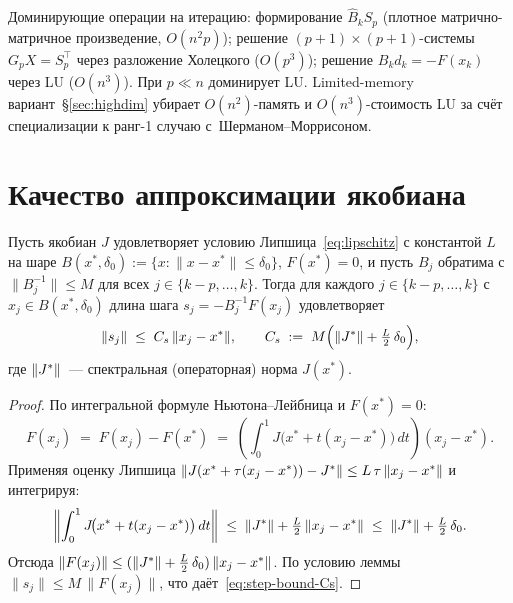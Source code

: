 \begin{remark}[Сложность]\label{rem:complexity}
Доминирующие операции на итерацию: формирование $\widehat B_k S_p$
(плотное матрично-матричное произведение, $O(n^2 p)$); решение
$(p{+}1)\times(p{+}1)$-системы $G_p X = S_p^\top$ через разложение
Холецкого ($O(p^3)$); решение $B_k d_k = -F(x_k)$ через LU
($O(n^3)$). При $p\ll n$ доминирует LU.
Limited-memory вариант~\S\ref{sec:highdim} убирает $O(n^2)$-память
и $O(n^3)$-стоимость LU за счёт специализации к ранг-1 случаю
с~Шерманом--Моррисоном.
\end{remark}

\section{Качество аппроксимации якобиана}\label{sec:sp-broyden-proof}



\begin{lemma}
\label{lem:step-bound}
Пусть якобиан $J$ удовлетворяет условию Липшица~\eqref{eq:lipschitz}
с константой $L$ на шаре $B(x^{*}, \delta_0) := \{x : \|x - x^{*}\| \le \delta_0\}$,
$F(x^{*}) = 0$, и пусть $B_j$ обратима с $\|B_j^{-1}\| \le M$
для всех $j \in \{k{-}p,\ldots,k\}$. Тогда для каждого
$j \in \{k{-}p,\ldots,k\}$ с $x_j \in B(x^{*}, \delta_0)$ длина шага
$s_j = -B_j^{-1} F(x_j)$ удовлетворяет
\begin{equation}\label{eq:step-bound-Cs}
  \|s_j\| \;\le\; C_s\,\|x_j - x^{*}\|,
  \qquad
  C_s \;:=\; M\Big(\|J^{*}\| + \tfrac{L}{2}\,\delta_0\Big),
\end{equation}
где $\|J^{*}\|$~--- спектральная (операторная) норма $J(x^{*})$.
\end{lemma}

\begin{proof}
По интегральной формуле Ньютона--Лейбница и $F(x^{*}) = 0$:
\[
  F(x_j) \;=\; F(x_j) - F(x^{*})
  \;=\; \left(\int_{0}^{1} J\!\big(x^{*} + t(x_j - x^{*})\big)\,dt\right)(x_j - x^{*}).
\]
Применяя оценку Липшица $\|J(x^{*} + \tau(x_j-x^{*})) - J^{*}\| \le L\,\tau\,\|x_j-x^{*}\|$
и интегрируя:
\[
  \left\|\int_{0}^{1} J\!\big(x^{*} + t(x_j-x^{*})\big)\,dt\right\|
  \;\le\; \|J^{*}\| + \tfrac{L}{2}\,\|x_j - x^{*}\|
  \;\le\; \|J^{*}\| + \tfrac{L}{2}\,\delta_0.
\]
Отсюда $\|F(x_j)\| \le (\|J^{*}\| + \tfrac{L}{2}\,\delta_0)\,\|x_j - x^{*}\|$.
По условию леммы $\|s_j\| \le M\,\|F(x_j)\|$, что даёт~\eqref{eq:step-bound-Cs}.
\end{proof}


